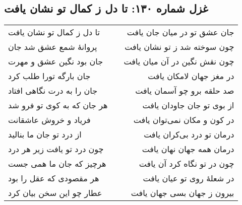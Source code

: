\begin{center}
\section*{غزل شماره ۱۳۰: تا دل ز کمال تو نشان یافت}
\label{sec:130}
\begin{longtable}{l p{0.5cm} r}
تا دل ز کمال تو نشان یافت
&&
جان عشق تو در میان جان یافت
\\
پروانهٔ شمع عشق شد جان
&&
چون سوخته شد ز تو نشان یافت
\\
جان بود نگین عشق و مهرت
&&
چون نقش نگین در آن میان یافت
\\
جان بارگه تورا طلب کرد
&&
در مغز جهان لامکان یافت
\\
جان را به درت نگاهی افتاد
&&
صد حلقه برو چو آسمان یافت
\\
هر جان که به کوی تو فرو شد
&&
از بوی تو جان جاودان یافت
\\
فریاد و خروش عاشقانت
&&
در کون و مکان نمی‌توان یافت
\\
از درد تو جان ما بنالید
&&
درمان تو درد بی‌کران یافت
\\
چون درد تو یافت زیر هر درد
&&
درمان همه جهان نهان یافت
\\
هرچیز که جان ما همی جست
&&
چون در تو نگاه کرد آن یافت
\\
هر مقصودی که عقل را بود
&&
در شعلهٔ روی تو عیان یافت
\\
عطار چو این سخن بیان کرد
&&
بیرون ز جهان بسی جهان یافت
\\
\end{longtable}
\end{center}
